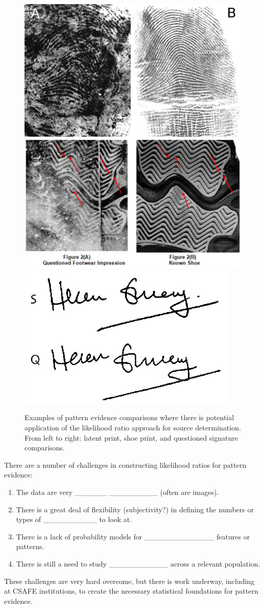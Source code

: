 \documentclass[]{book}
\providecommand{\tightlist}{%
  \setlength{\itemsep}{0pt}\setlength{\parskip}{0pt}}
\theoremstyle{definition}
\theoremstyle{definition}
\theoremstyle{remark}
\begin{document}
\begin{figure}
\includegraphics[width=0.32\linewidth]{img/mayfieldfinger} \includegraphics[width=0.32\linewidth]{img/shoecompare} \includegraphics[width=0.32\linewidth]{img/signature} \caption{Examples of pattern evidence comparisons where there is potential application of the likelihood ratio approach for source determination. From left to right: latent print, shoe print, and questioned signature comparisons.}\label{fig:trace}
\end{figure}

There are a number of challenges in constructing likelihood ratios for
pattern evidence:

\begin{enumerate}
\def\labelenumi{\arabic{enumi}.}
\tightlist
\item
  The data are very \_\_\_\_\_\_ \_\_\_\_\_\_\_\_\_ (often are images).
  \vspace{.1in}
\item
  There is a great deal of flexibility (subjectivity?) in defining the
  numbers or types of \_\_\_\_\_\_\_\_\_\_ to look at. \vspace{.1in}
\item
  There is a lack of probability models for \_\_\_\_\_\_\_\_\_\_\_\_\_
  features or patterns. \vspace{.1in}
\item
  There is still a need to study \_\_\_\_\_\_\_\_\_\_\_ across a
  relevant population.
\end{enumerate}

These challenges are very hard overcome, but there is work underway,
including at CSAFE institutions, to create the necessary statistical
foundations for pattern evidence.
\end{document}
